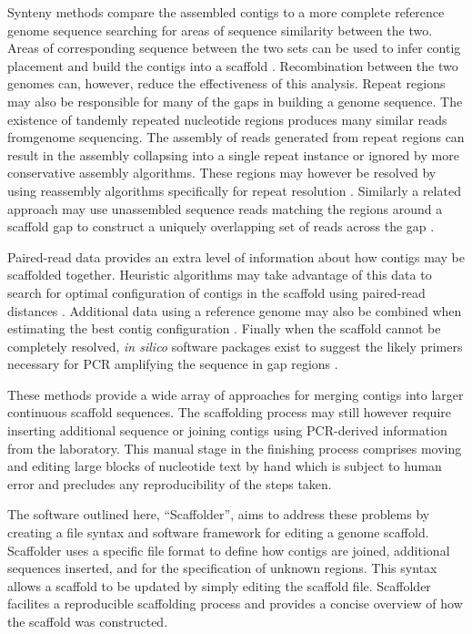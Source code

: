 \documentclass[10pt]{bmc_article}
\newenvironment{bmcformat}{\begin{raggedright}\baselineskip20pt\sloppy\setboolean{publ}{false}}{\end{raggedright}\baselineskip20pt\sloppy}
\begin{document}
\begin{bmcformat}
Synteny methods compare the assembled contigs to a more complete reference
genome sequence searching for areas of sequence similarity between the two.
Areas of corresponding sequence between the two sets can be used to infer
contig placement and build the contigs into a scaffold
\cite{richter2007,zhao2008,assefa2009}. Recombination between the two genomes
can, however, reduce the effectiveness of this analysis. Repeat regions may
also be responsible for many of the gaps in building a genome sequence. The
existence of tandemly repeated nucleotide regions produces many similar reads
fromgenome sequencing. The assembly of reads generated from repeat regions can
result in the assembly collapsing into a single repeat instance or ignored by
more conservative assembly algorithms. These regions may however be resolved by
using reassembly algorithms specifically for repeat resolution
\cite{mulyukov2002,koren2010}. Similarly a related approach may use unassembled
sequence reads matching the regions around a scaffold gap to construct
a uniquely overlapping set of reads across the gap \cite{tsai2010}. \pb

Paired-read data provides an extra level of information about how contigs may
be scaffolded together. Heuristic algorithms may take advantage of this data to
search for optimal configuration of contigs in the scaffold using paired-read
distances \cite{dayarian2010,boetzer2011}. Additional data using a reference
genome may also be combined when estimating the best contig configuration
\cite{pop2004}. Finally when the scaffold cannot be completely resolved,
\emph{in silico} software packages exist to suggest the likely primers
necessary for PCR amplifying the sequence in gap regions
\cite{gordon2001,nagarajan2010}. \pb

These methods provide a wide array of approaches for merging contigs into
larger continuous scaffold sequences. The scaffolding process may still however
require inserting additional sequence or joining contigs using PCR-derived
information from the laboratory. This manual stage in the finishing process
comprises moving and editing large blocks of nucleotide text by hand which is
subject to human error and precludes any reproducibility of the steps taken.
\pb

The software outlined here, ``Scaffolder'', aims to address these problems by
creating a file syntax and software framework for editing a genome scaffold.
Scaffolder uses a specific file format to define how contigs are joined,
additional sequences inserted, and for the specification of unknown regions.
This syntax allows a scaffold to be updated by simply editing the scaffold
file. Scaffolder facilites a reproducible scaffolding process and provides
a concise overview of how the scaffold was constructed. \pb


\end{bmcformat}
\end{document}
